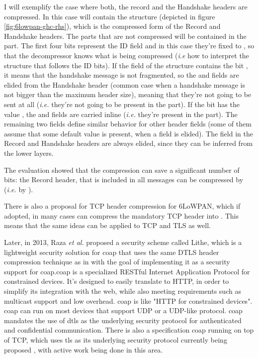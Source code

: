 \documentclass{llncs}
\begin{document}
I will exemplify the case where both, the record and the Handshake headers are compressed.
In this case  will contain the 
structure (depicted in figure \ref{fig:6lowpan-ghc-rhs}), which is the compressed form of the Record and Handshake headers. The
parts that are not compressed will be contained in the  part.
The first four bits represent the ID field and in this case they're fixed to ,
so that the decompressor knows what is being compressed (\textit{i.e} how to interpret
the structure that follows the ID bits). If the  field of the  structure contains the
bit , it means that the handshake message is not fragmented, so
the  and  fields are
elided from the Handshake header (common case when a handshake message is not bigger than
the maximum header size), meaning that they're not going to be sent at
all (\textit{i.e.} they're not going to be present in the  part).
If the  bit has the value , the 
and  fields are carried inline (\textit{i.e.} they're
present in the  part). The remaining two fields define similar
behavior for other header fields (some of them assume that some default value is present, when a field is elided).
The  field in the Record and Handshake headers are always elided,
since they can be inferred from the lower layers.

The evaluation showed that the compression can save a significant number of bits:
the Record header, that is included in all messages can be compressed by 
(\textit{i.e.} by ).

There is also a proposal for TCP header compression for 6LoWPAN\cite{I-D.aayadi-6lowpan-tcphc},
which if adopted, in many cases can compress the mandatory  TCP header
into . This means that the same ideas can be applied to TCP and
TLS as well.

Later, in 2013, Raza \textit{et al.} proposed a security scheme called Lithe\cite{LitheLig40:online},
which is a lightweight security solution for \gls{coap} that uses the same DTLS header
compression technique as in \cite{6LoWPANC53:online} with the goal of implementing
it as a security support for \gls{coap}.\gls{coap}\cite{RFC7959} is a specialized
RESTful Internet Application Protocol for constrained devices. It's designed to easily
translate to HTTP, in order to simplify its integration with the web,
while also meeting requirements such as multicast support and low overhead.
\gls{coap} is like "HTTP for constrained devices".
\gls{coap} can run on most devices that support UDP or a UDP-like protocol.
\gls{coap} mandates the use of \gls{dtls} as the underlying security protocol for
authenticated and confidential communication. There is also a specification \gls{coap}
running on top of TCP, which uses \gls{tls} as its underlying security protocol
currently being proposed \cite{I-D.ietf-core-coap-tcp-tls},
with active work being done in this area.
\end{document}
